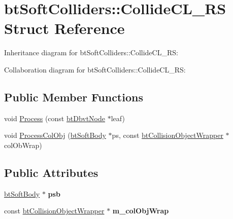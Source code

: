 \hypertarget{structbt_soft_colliders_1_1_collide_c_l___r_s}{\section{bt\+Soft\+Colliders\+:\+:Collide\+C\+L\+\_\+\+R\+S Struct Reference}
\label{structbt_soft_colliders_1_1_collide_c_l___r_s}
}


Inheritance diagram for bt\+Soft\+Colliders\+:\+:Collide\+C\+L\+\_\+\+R\+S\+:


Collaboration diagram for bt\+Soft\+Colliders\+:\+:Collide\+C\+L\+\_\+\+R\+S\+:
\subsection*{Public Member Functions}
\begin{DoxyCompactItemize}
\item 
void \hyperlink{structbt_soft_colliders_1_1_collide_c_l___r_s_a020b9712f8e0c9c2dd901c93a1f97120}{Process} (const \hyperlink{structbt_dbvt_node}{bt\+Dbvt\+Node} $\ast$leaf)
\item 
void \hyperlink{structbt_soft_colliders_1_1_collide_c_l___r_s_a34f463ddcfcda480e9843277d4bd732e}{Process\+Col\+Obj} (\hyperlink{classbt_soft_body}{bt\+Soft\+Body} $\ast$ps, const \hyperlink{structbt_collision_object_wrapper}{bt\+Collision\+Object\+Wrapper} $\ast$col\+Ob\+Wrap)
\end{DoxyCompactItemize}
\subsection*{Public Attributes}
\begin{DoxyCompactItemize}
\item 
\hypertarget{structbt_soft_colliders_1_1_collide_c_l___r_s_a0662ec8322a255b1dbc22b8ae512cd9c}{\hyperlink{classbt_soft_body}{bt\+Soft\+Body} $\ast$ {\bfseries psb}}\label{structbt_soft_colliders_1_1_collide_c_l___r_s_a0662ec8322a255b1dbc22b8ae512cd9c}

\item 
\hypertarget{structbt_soft_colliders_1_1_collide_c_l___r_s_a8e9189fbd214b4f700536892d098d0f4}{const \hyperlink{structbt_collision_object_wrapper}{bt\+Collision\+Object\+Wrapper} $\ast$ {\bfseries m\+\_\+col\+Obj\+Wrap}}\label{structbt_soft_colliders_1_1_collide_c_l___r_s_a8e9189fbd214b4f700536892d098d0f4}

\end{DoxyCompactItemize}


